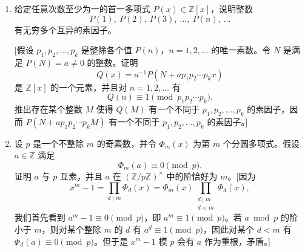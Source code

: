 \begin{enumerate}[label=\arabic*.]
\begin{enumerate}[label=(\alph*)]
	 	\item $D$ 的非零元素 $D^\times$ 构成一个乘法群。对任意 $x\in D^\times$，证明 $D$ 中与 $x$ 交换的元素构成一个包含 $Z$ 的除环。说明这个除环的阶为 $q^m$，其中 $m$ 是某个整数，并且若 $x$ 不是 $Z$ 的元素，则 $m<n$。
	 	
	 	\item 证明群 $D^\times$ 的类方程（定理 4.7）是
	 	\[
	 	q^n-1=(q-1)+\sum_{i=1}^r\frac{q^n-1}{|C_{D^\times}(x_i)|},
	 	\]
	 	其中 $x_1,x_2,\ldots,x_r$ 是 $D^\times$ 中不包含在 $D^\times$ 的中心里的互异共轭类的代表元。由 (b) 推出对每个 $i$，
	 	\[
	 	|C_{D^\times}(x_i)|=q^{m_i}-1
	 	\]
	 	其中某个 $m_i<n$。
	 	
	 	\item 证明由于
	 	\[
	 	\frac{q^n-1}{q^{m_i}-1}
	 	\]
	 	是整数（即，指数 $|D^\times:C_{D^\times}(x_i)|$），所以 $m_i$ 整除 $n$（参见第 5 节练习 4）。推出 $\Phi_n(x)$ 整除 $(x^n-1)/(x^{m_i}-1)$，从而整数 $\Phi_n(q)$ 整除 $(q^n-1)/(q^{m_i}-1)$，$i=1,2,\ldots,r$。
	 	
	 	\item 证明 (c) 和 (d) 推出
	 	\[
	 	\Phi_n(q)=\prod_{\substack{\zeta\text{ primitive}}}(q-\zeta)
	 	\]
	 	整除 $q-1$。证明对任意单位根 $\zeta\neq1$，有 $|q-\zeta|>q-1$（复绝对值）[注意，$1$ 是单位圆上到实直线上的点 $q$ 最近的点]。推出 $n=1$，即 $D=Z$ 是一个域。
	 \end{enumerate}
	 
	 下面的练习给出一个证明：对任意正整数 $m$，存在无穷多个素数 $p$ 满足 $p\equiv1\pmod m$。这是算术级数中素数的 Dirichlet 定理的一个特殊情形；该定理更一般地断言，对任意与 $m$ 互素的 $a$，存在无穷多个素数 $p$ 满足 $p\equiv a\pmod m$。
	 
	 \item 给定任意次数至少为一的首一多项式 $P(x)\in\mathbb Z[x]$，说明整数
	 \[
	 P(1),\ P(2),\ P(3),\ \ldots,\ P(n),\ \ldots
	 \]
	 有无穷多个互异的素因子。
	 
	 [假设 $p_1,p_2,\ldots,p_k$ 是整除各个值 $P(n)$，$n=1,2,\ldots$ 的唯一素数。令 $N$ 是满足 $P(N)=a\neq0$ 的整数。证明
	 \[
	 Q(x)=a^{-1}P(N+ap_1p_2\cdots p_kx)
	 \]
	 是 $\mathbb Z[x]$ 的一个元素，并且对 $n=1,2,\ldots$ 有
	 \[
	 Q(n)\equiv1\pmod {p_1p_2\cdots p_k}.
	 \]
	 推出存在某个整数 $M$ 使得 $Q(M)$ 有一个不同于 $p_1,p_2,\ldots,p_k$ 的素因子，因而 $P(N+ap_1p_2\cdots p_kM)$ 有一个不同于 $p_1,p_2,\ldots,p_k$ 的素因子。]
	 
	 \item 设 $p$ 是一个不整除 $m$ 的奇素数，并令 $\Phi_m(x)$ 为第 $m$ 个分圆多项式。假设 $a\in\mathbb Z$ 满足
	 \[
	 \Phi_m(a)\equiv0\pmod p.
	 \]
	 证明 $a$ 与 $p$ 互素，并且 $a$ 在 $(\mathbb Z/p\mathbb Z)^\times$ 中的阶恰好为 $m$。[因为
	 \[
	 x^m-1=\prod_{d\mid m}\Phi_d(x)=\Phi_m(x)\prod_{\substack{d\mid m\\ d<m}}\Phi_d(x),
	 \]
	 我们首先看到 $a^m-1\equiv0\pmod p$，即 $a^m\equiv1\pmod p$。若 $a\bmod p$ 的阶小于 $m$，则对某个整除 $m$ 的 $d$ 有 $a^d\equiv1\pmod p$，因此对某个 $d<m$ 有 $\Phi_d(a)\equiv0\pmod p$。但于是 $x^m-1$ 模 $p$ 会有 $a$ 作为重根，矛盾。]
	 

\end{enumerate}
